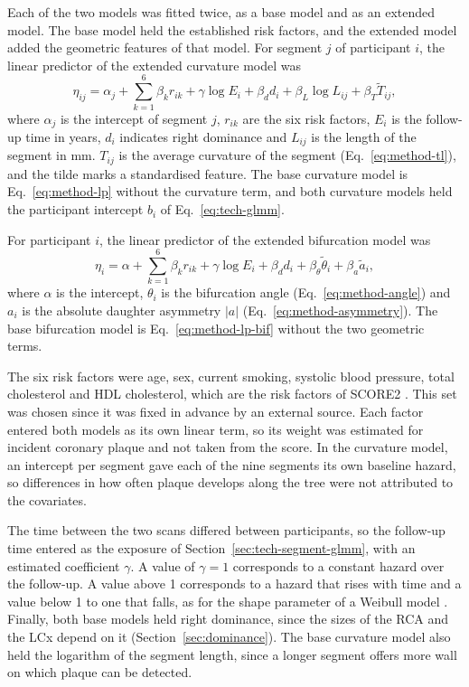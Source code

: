 Each of the two models was fitted twice, as a base model and as an extended model.
The base model held the established risk factors, and the extended model added the geometric features of that model.
For segment $j$ of participant $i$, the linear predictor of the extended curvature model was
\begin{equation}
  \eta_{ij} = \alpha_j + \sum_{k=1}^{6} \beta_k r_{ik} + \gamma \log E_i + \beta_d d_i + \beta_L \log L_{ij} + \beta_T \tilde{T}_{ij} ,
  \label{eq:method-lp}
\end{equation}
where $\alpha_j$ is the intercept of segment $j$, $r_{ik}$ are the six risk factors, $E_i$ is the follow-up time in years, $d_i$ indicates right dominance and $L_{ij}$ is the length of the segment in mm.
$T_{ij}$ is the average curvature of the segment (Eq.~\eqref{eq:method-tl}), and the tilde marks a standardised feature.
The base curvature model is Eq.~\eqref{eq:method-lp} without the curvature term, and both curvature models held the participant intercept $b_i$ of Eq.~\eqref{eq:tech-glmm}.

For participant $i$, the linear predictor of the extended bifurcation model was
\begin{equation}
  \eta_{i} = \alpha + \sum_{k=1}^{6} \beta_k r_{ik} + \gamma \log E_i + \beta_d d_i + \beta_\theta \tilde{\theta}_i + \beta_a \tilde{a}_i ,
  \label{eq:method-lp-bif}
\end{equation}
where $\alpha$ is the intercept, $\theta_i$ is the bifurcation angle (Eq.~\eqref{eq:method-angle}) and $a_i$ is the absolute daughter asymmetry $|a|$ (Eq.~\eqref{eq:method-asymmetry}).
The base bifurcation model is Eq.~\eqref{eq:method-lp-bif} without the two geometric terms.

The six risk factors were age, sex, current smoking, systolic blood pressure, total cholesterol and HDL cholesterol, which are the risk factors of SCORE2 \cite{score2_2021}.
This set was chosen since it was fixed in advance by an external source.
Each factor entered both models as its own linear term, so its weight was estimated for incident coronary plaque and not taken from the score.
In the curvature model, an intercept per segment gave each of the nine segments its own baseline hazard, so differences in how often plaque develops along the tree were not attributed to the covariates.

The time between the two scans differed between participants, so the follow-up time entered as the exposure of Section~\ref{sec:tech-segment-glmm}, with an estimated coefficient $\gamma$.
A value of $\gamma = 1$ corresponds to a constant hazard over the follow-up.
A value above 1 corresponds to a hazard that rises with time and a value below 1 to one that falls, as for the shape parameter of a Weibull model \cite[Section~10.2.3]{dobson2002glm}.
Finally, both base models held right dominance, since the sizes of the RCA and the LCx depend on it (Section~\ref{sec:dominance}).
The base curvature model also held the logarithm of the segment length, since a longer segment offers more wall on which plaque can be detected.

